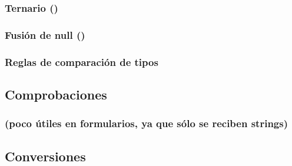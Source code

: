 \documentclass[a4paper,11pt,spanish]{sphinxmanual}
\begin{document}
\subsubsection{Ternario ()}
\label{\detokenize{php:ternario}}

\subsubsection{Fusión de null ()}
\label{\detokenize{php:fusion-de-null}}

\subsubsection{Reglas de comparación de tipos}
\label{\detokenize{php:reglas-de-comparacion-de-tipos}}

\subsection{Comprobaciones}
\label{\detokenize{php:comprobaciones}}

\subsubsection{}
\label{\detokenize{php:gettype}}

\subsubsection{ (poco útiles en formularios, ya que sólo se reciben strings)}
\label{\detokenize{php:is-poco-utiles-en-formularios-ya-que-solo-se-reciben-strings}}

\subsubsection{}
\label{\detokenize{php:is-numeric}}

\subsubsection{}
\label{\detokenize{php:ctype}}

\subsection{Conversiones}
\label{\detokenize{php:conversiones}}
\end{document}
